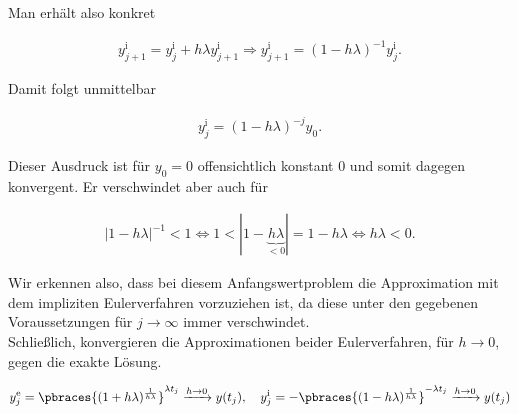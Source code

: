 \begin{solution}
Man erhält also konkret

\begin{align*}
  y_{j+1}^{\mathrm{i}}
  =
  y_j^{\mathrm{i}} + h \lambda y_{j+1}^{\mathrm{i}}
  \Rightarrow
  y_{j+1}^{\mathrm{i}}
  =
  (1 - h \lambda)^{-1} y_j^{\mathrm{i}}.
\end{align*}

Damit folgt unmittelbar

\begin{align*}
  y_j^{\mathrm{i}}
  =
  (1 - h \lambda)^{-j} y_0.
\end{align*}

Dieser Ausdruck ist für $y_0 = 0$ offensichtlich konstant $0$ und somit dagegen konvergent.
Er verschwindet aber auch für

\begin{align*}
  |1 - h \lambda|^{-1} < 1
  \Leftrightarrow
  1 < |1 - \underbrace{h \lambda}_{< 0}| = 1 - h \lambda
  \Leftrightarrow
  h \lambda < 0.
\end{align*}

Wir erkennen also, dass bei diesem Anfangswertproblem die Approximation mit dem impliziten Eulerverfahren vorzuziehen ist, da
diese unter den gegebenen Voraussetzungen für $j \to \infty$ immer verschwindet. \\

Schließlich, konvergieren die Approximationen beider Eulerverfahren, für $h \to 0$, gegen die exakte Lösung.

\begin{align*}
  y_j^{\mathrm{e}}
  =
  \pbraces
  {
    (1 + h \lambda)^\frac{1}{h \lambda}
  }^{\lambda t_j}
  \xrightarrow{h \to 0}
  y(t_j),
  \quad
  y_j^{\mathrm{i}}
  =
  -\pbraces
  {
    (1 - h \lambda)^\frac{1}{h \lambda}
  }^{-\lambda t_j}
  \xrightarrow{h \to 0}
  y(t_j)
\end{align*}

\end{solution}
